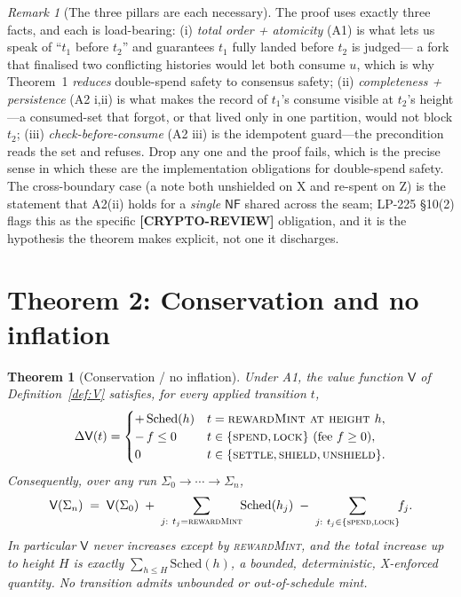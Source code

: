 \documentclass[11pt]{article}
\newtheorem{theorem}{Theorem}
\theoremstyle{definition}
\theoremstyle{remark}
\newtheorem{remark}{Remark}
\newcommand{\CRYPTO}{\textbf{[CRYPTO-REVIEW]}}
\newcommand{\Val}{\mathsf{V}}
\newcommand{\NF}{\mathsf{NF}}
\begin{document}
\begin{remark}[The three pillars are each necessary]
\label{rem:t1pillars}
The proof uses exactly three facts, and each is load-bearing:
(i) \emph{total order + atomicity} (A1) is what lets us speak of ``$t_1$
before $t_2$'' and guarantees $t_1$ fully landed before $t_2$ is judged---
a fork that finalised two conflicting histories would let both consume $u$,
which is why Theorem~1 \emph{reduces} double-spend safety to consensus
safety; (ii) \emph{completeness + persistence} (A2 i,ii) is what makes the
record of $t_1$'s consume visible at $t_2$'s height---a consumed-set that
forgot, or that lived only in one partition, would not block $t_2$; (iii)
\emph{check-before-consume} (A2 iii) is the idempotent guard---the
precondition reads the set and refuses. Drop any one and the proof fails,
which is the precise sense in which these are the implementation
obligations for double-spend safety. The cross-boundary case (a note both
unshielded on X and re-spent on Z) is the statement that A2(ii) holds for a
\emph{single} $\NF$ shared across the seam; LP-225 \S10(2) flags this as the
specific \CRYPTO{} obligation, and it is the hypothesis the theorem makes
explicit, not one it discharges.
\end{remark}

\section{Theorem 2: Conservation and no inflation}
\label{sec:t2}

\begin{theorem}[Conservation / no inflation]
\label{thm:conserve}
Under A1, the value function $\Val$ of Definition~\ref{def:V} satisfies, for
every applied transition $t$,
\[
  \Delta\Val(t) =
  \begin{cases}
    +\,\mathrm{Sched}(h) & t = \textsc{rewardMint at height } h,\\
    -\,f \le 0 & t \in \{\textsc{spend},\textsc{lock}\}\ \text{(fee } f \ge 0),\\
    0 & t \in \{\textsc{settle},\textsc{shield},\textsc{unshield}\}.
  \end{cases}
\]
Consequently, over any run $\Sigma_0\to\cdots\to\Sigma_n$,
\[
  \Val(\Sigma_n) \;=\; \Val(\Sigma_0)
    \;+\; \sum_{\substack{j:\ t_j=\textsc{rewardMint}}}\!\!\mathrm{Sched}(h_j)
    \;-\; \sum_{\substack{j:\ t_j\in\{\textsc{spend},\textsc{lock}\}}}\!\! f_j.
\]
In particular $\Val$ never increases except by \textsc{rewardMint}, and the
total increase up to height $H$ is exactly
$\sum_{h\le H}\mathrm{Sched}(h)$, a bounded, deterministic, X-enforced
quantity. No transition admits unbounded or out-of-schedule mint.
\end{theorem}
\end{document}
